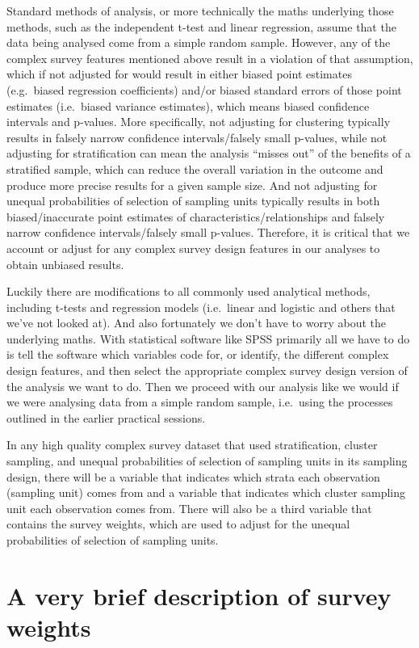 \documentclass[
]{book}
\begin{document}
Standard methods of analysis, or more technically the maths underlying those methods, such as the independent t-test and linear regression, assume that the data being analysed come from a simple random sample. However, any of the complex survey features mentioned above result in a violation of that assumption, which if not adjusted for would result in either biased point estimates (e.g.~biased regression coefficients) and/or biased standard errors of those point estimates (i.e.~biased variance estimates), which means biased confidence intervals and p-values. More specifically, not adjusting for clustering typically results in falsely narrow confidence intervals/falsely small p-values, while not adjusting for stratification can mean the analysis ``misses out'' of the benefits of a stratified sample, which can reduce the overall variation in the outcome and produce more precise results for a given sample size. And not adjusting for unequal probabilities of selection of sampling units typically results in both biased/inaccurate point estimates of characteristics/relationships and falsely narrow confidence intervals/falsely small p-values. Therefore, it is critical that we account or adjust for any complex survey design features in our analyses to obtain unbiased results.

Luckily there are modifications to all commonly used analytical methods, including t-tests and regression models (i.e.~linear and logistic and others that we've not looked at). And also fortunately we don't have to worry about the underlying maths. With statistical software like SPSS primarily all we have to do is tell the software which variables code for, or identify, the different complex design features, and then select the appropriate complex survey design version of the analysis we want to do. Then we proceed with our analysis like we would if we were analysing data from a simple random sample, i.e.~using the processes outlined in the earlier practical sessions.

In any high quality complex survey dataset that used stratification, cluster sampling, and unequal probabilities of selection of sampling units in its sampling design, there will be a variable that indicates which strata each observation (sampling unit) comes from and a variable that indicates which cluster sampling unit each observation comes from. There will also be a third variable that contains the survey weights, which are used to adjust for the unequal probabilities of selection of sampling units.

\hypertarget{a-very-brief-description-of-survey-weights}{%
\section{A very brief description of survey weights}\label{a-very-brief-description-of-survey-weights}}
\end{document}
